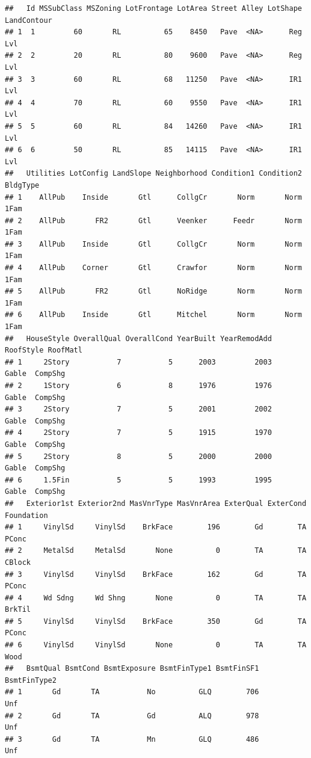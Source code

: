 \documentclass[
]{article}
\begin{document}
\begin{verbatim}
##   Id MSSubClass MSZoning LotFrontage LotArea Street Alley LotShape LandContour
## 1  1         60       RL          65    8450   Pave  <NA>      Reg         Lvl
## 2  2         20       RL          80    9600   Pave  <NA>      Reg         Lvl
## 3  3         60       RL          68   11250   Pave  <NA>      IR1         Lvl
## 4  4         70       RL          60    9550   Pave  <NA>      IR1         Lvl
## 5  5         60       RL          84   14260   Pave  <NA>      IR1         Lvl
## 6  6         50       RL          85   14115   Pave  <NA>      IR1         Lvl
##   Utilities LotConfig LandSlope Neighborhood Condition1 Condition2 BldgType
## 1    AllPub    Inside       Gtl      CollgCr       Norm       Norm     1Fam
## 2    AllPub       FR2       Gtl      Veenker      Feedr       Norm     1Fam
## 3    AllPub    Inside       Gtl      CollgCr       Norm       Norm     1Fam
## 4    AllPub    Corner       Gtl      Crawfor       Norm       Norm     1Fam
## 5    AllPub       FR2       Gtl      NoRidge       Norm       Norm     1Fam
## 6    AllPub    Inside       Gtl      Mitchel       Norm       Norm     1Fam
##   HouseStyle OverallQual OverallCond YearBuilt YearRemodAdd RoofStyle RoofMatl
## 1     2Story           7           5      2003         2003     Gable  CompShg
## 2     1Story           6           8      1976         1976     Gable  CompShg
## 3     2Story           7           5      2001         2002     Gable  CompShg
## 4     2Story           7           5      1915         1970     Gable  CompShg
## 5     2Story           8           5      2000         2000     Gable  CompShg
## 6     1.5Fin           5           5      1993         1995     Gable  CompShg
##   Exterior1st Exterior2nd MasVnrType MasVnrArea ExterQual ExterCond Foundation
## 1     VinylSd     VinylSd    BrkFace        196        Gd        TA      PConc
## 2     MetalSd     MetalSd       None          0        TA        TA     CBlock
## 3     VinylSd     VinylSd    BrkFace        162        Gd        TA      PConc
## 4     Wd Sdng     Wd Shng       None          0        TA        TA     BrkTil
## 5     VinylSd     VinylSd    BrkFace        350        Gd        TA      PConc
## 6     VinylSd     VinylSd       None          0        TA        TA       Wood
##   BsmtQual BsmtCond BsmtExposure BsmtFinType1 BsmtFinSF1 BsmtFinType2
## 1       Gd       TA           No          GLQ        706          Unf
## 2       Gd       TA           Gd          ALQ        978          Unf
## 3       Gd       TA           Mn          GLQ        486          Unf

\end{verbatim}
\end{document}
